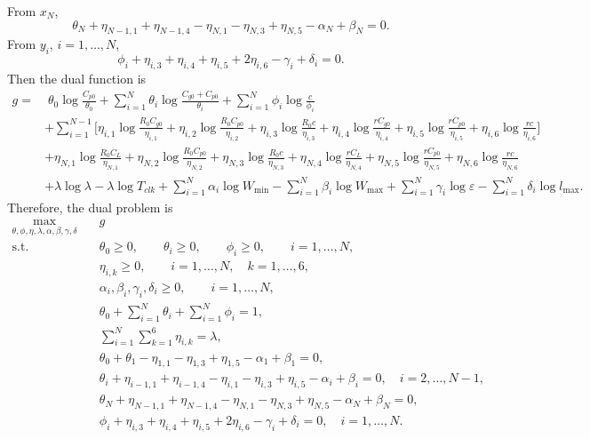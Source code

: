 \documentclass{article}
\begin{document}
From \(x_N\),
\begin{equation}\nonumber
	\theta_N+\eta_{N-1,1}+\eta_{N-1,4}-\eta_{N,1}-\eta_{N,3}+\eta_{N,5}-\alpha_N+\beta_N=0.
	\label{eq:xN-balance}
\end{equation}
From \(y_i\), \(i=1,\dots,N\),
\begin{equation}\nonumber
	\phi_i+\eta_{i,3}+\eta_{i,4}+\eta_{i,5}+2\eta_{i,6}-\gamma_i+\delta_i=0.
	\label{eq:yi-balance}
\end{equation}
Then the dual function is
\begin{equation}\nonumber
	\begin{aligned}
		g
		=
		 & \;
		\theta_0\log\frac{C_{p0}}{\theta_0}
		+\sum_{i=1}^N \theta_i\log\frac{C_{g0}+C_{p0}}{\theta_i}
		+\sum_{i=1}^N \phi_i\log\frac{c}{\phi_i}
		\\
		 & +\sum_{i=1}^{N-1}\Bigg[
			\eta_{i,1}\log\frac{R_0C_{g0}}{\eta_{i,1}}
			+\eta_{i,2}\log\frac{R_0C_{p0}}{\eta_{i,2}}
			+\eta_{i,3}\log\frac{R_0c}{\eta_{i,3}}
			+\eta_{i,4}\log\frac{rC_{g0}}{\eta_{i,4}}
			+\eta_{i,5}\log\frac{rC_{p0}}{\eta_{i,5}}
			+\eta_{i,6}\log\frac{rc}{\eta_{i,6}}
			\Bigg]
		\\
		 & +\eta_{N,1}\log\frac{R_0C_L}{\eta_{N,1}}
		+\eta_{N,2}\log\frac{R_0C_{p0}}{\eta_{N,2}}
		+\eta_{N,3}\log\frac{R_0c}{\eta_{N,3}}
		+\eta_{N,4}\log\frac{rC_L}{\eta_{N,4}}
		+\eta_{N,5}\log\frac{rC_{p0}}{\eta_{N,5}}
		+\eta_{N,6}\log\frac{rc}{\eta_{N,6}}
		\\
		 & +\lambda\log\lambda-\lambda\log T_{clk}
		+\sum_{i=1}^N \alpha_i\log W_{\min}
		-\sum_{i=1}^N \beta_i\log W_{\max}
		+\sum_{i=1}^N \gamma_i\log\varepsilon
		-\sum_{i=1}^N \delta_i\log l_{\max}.
	\end{aligned}
	\label{eq:dual-function}
\end{equation}
Therefore, the dual problem is
\begin{equation}\nonumber
	\begin{aligned}
		\max_{\theta,\phi,\eta,\lambda,\alpha,\beta,\gamma,\delta}\quad & 
		g\\
		\text{s.t.}\quad
		    & \theta_0\ge 0,\qquad \theta_i\ge 0,\qquad \phi_i\ge 0,\qquad i=1,\dots,N,\\
		    & \eta_{i,k}\ge 0,\qquad i=1,\dots,N,\quad k=1,\dots,6,\\
		    & \alpha_i,\beta_i,\gamma_i,\delta_i\ge 0,\qquad i=1,\dots,N,\\
		    & \theta_0+\sum_{i=1}^N \theta_i+\sum_{i=1}^N \phi_i=1,\\
		    & \sum_{i=1}^N\sum_{k=1}^6 \eta_{i,k}=\lambda,\\
		    & \theta_0+\theta_1-\eta_{1,1}-\eta_{1,3}+\eta_{1,5}-\alpha_1+\beta_1=0,\\
		    & \theta_i+\eta_{i-1,1}+\eta_{i-1,4}-\eta_{i,1}-\eta_{i,3}+\eta_{i,5}-\alpha_i+\beta_i=0,\quad i=2,\dots,N-1,\\
		    & \theta_N+\eta_{N-1,1}+\eta_{N-1,4}-\eta_{N,1}-\eta_{N,3}+\eta_{N,5}-\alpha_N+\beta_N=0,\\
		    & \phi_i+\eta_{i,3}+\eta_{i,4}+\eta_{i,5}+2\eta_{i,6}-\gamma_i+\delta_i=0,\quad i=1,\dots,N.
	\end{aligned}
	\label{eq:dual-problem}
\end{equation}
\end{document}
